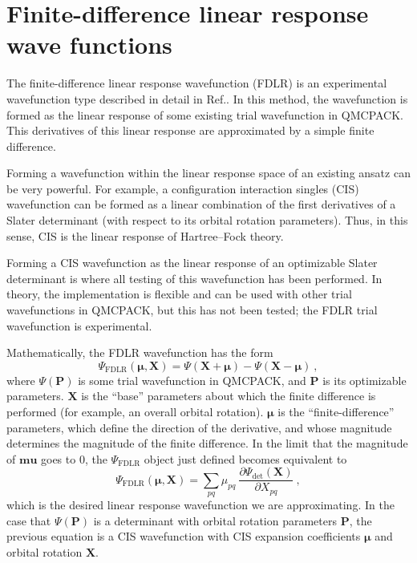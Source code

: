 \section{Finite-difference linear response wave functions}

\label{sec:fdlr}

The finite-difference linear response wavefunction (FDLR) is an
experimental wavefunction type described in detail in
Ref.\cite{blunt_charge-transfer_2017}. In this method, the wavefunction is formed as the linear response of some existing trial wavefunction in QMCPACK. This derivatives of this linear response are
approximated by a simple finite difference.

Forming a wavefunction within the linear response space of an existing ansatz can be very powerful. For example, a configuration interaction singles (CIS) wavefunction can be formed as a linear combination of the first derivatives of a Slater determinant (with respect to its orbital rotation parameters). Thus, in this sense, CIS is the linear response of Hartree--Fock theory.

Forming a CIS wavefunction as the linear response of an optimizable Slater determinant is where all testing of this wavefunction has been performed. In theory, the implementation is flexible and can be used with other trial wavefunctions in QMCPACK, but this has not been tested; the FDLR trial wavefunction is experimental.

Mathematically, the FDLR wavefunction has the form
\begin{equation}
\Psi_{\textrm{FDLR}} (\mathbf{\mu}, \mathbf{X}) = \Psi (\mathbf{X} + \mathbf{\mu}) - \Psi (\mathbf{X} - \mathbf{\mu})\: ,
\end{equation}
where $\Psi(\mathbf{P})$ is some trial wavefunction in QMCPACK, and $\mathbf{P}$ is its optimizable parameters. $\mathbf{X}$ is the ``base'' parameters about which the finite difference is performed (for example, an overall orbital rotation). $\mathbf{\mu}$ is the ``finite-difference'' parameters, which define the direction of the derivative, and whose magnitude determines the magnitude of the finite difference. In the limit that the magnitude of $\mathbf{mu}$ goes to $0$, the $\Psi_{\textrm{FDLR}}$ object just defined becomes equivalent to
\begin{equation}
\Psi_{\textrm{FDLR}} (\mathbf{\mu}, \mathbf{X}) = \sum_{pq} \mu_{pq} \: \frac{\partial \Psi_{\textrm{det}} (\mathbf{X}) }{\partial X_{pq}}\: ,
\end{equation}
which is the desired linear response wavefunction we are approximating. In the case that $\Psi(\mathbf{P})$ is a determinant with orbital rotation parameters $\mathbf{P}$, the previous equation is a CIS wavefunction with CIS expansion coefficients $\mathbf{\mu}$ and orbital rotation $\mathbf{X}$.

